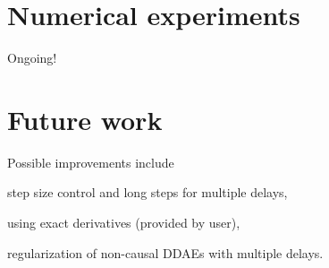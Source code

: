 \documentclass[final,reqno]{siamltex}
\renewenvironment{enumerate}[1]{\begin{compactenum}#1}{\end{compactenum}}
\begin{document}
\section{Numerical experiments}
Ongoing!

\section{Future work}
Possible improvements include
\begin{enumerate}
\item step size control and long steps for multiple delays,
\item using exact derivatives (provided by user),
\item regularization of non-causal DDAEs with multiple delays.
\end{enumerate}




%
\end{document}
